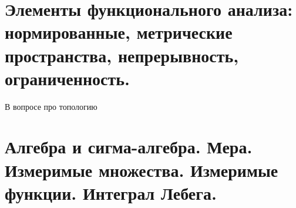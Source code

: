 \begin{multicols}{2}
    \section{Элементы функционального анализа: нормированные, метрические пространства,
    непрерывность, ограниченность.}
    В вопросе про топологию
    \section{Алгебра и сигма-алгебра. Мера. Измеримые множества. Измеримые функции. Интеграл
    Лебега.}
\end{multicols}